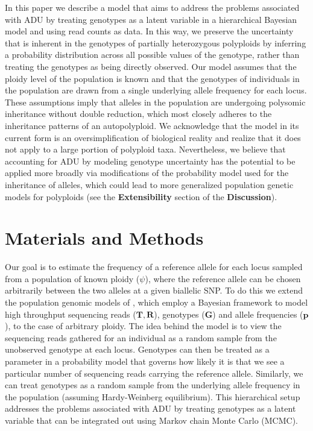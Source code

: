 \documentclass[11pt,english,letterpaper,oneside]{article}
\begin{document}
In this paper we describe a model that aims to address the problems associated with ADU by treating genotypes as a latent variable in a hierarchical Bayesian model and using read counts as data. In this way, we preserve the uncertainty that is inherent in the genotypes of partially heterozygous polyploids by inferring a probability distribution across all possible values of the genotype, rather than treating the genotypes as being directly observed. Our model assumes that the ploidy level of the population is known and that the genotypes of individuals in the population are drawn from a single underlying allele frequency for each locus. These assumptions imply that alleles in the population are undergoing polysomic inheritance without double reduction, which most closely adheres to the inheritance patterns of an autopolyploid. We acknowledge that the model in its current form is an oversimplification of biological reality and realize that it does not apply to a large portion of polyploid taxa. Nevertheless, we believe that accounting for ADU by modeling genotype uncertainty has the potential to be applied more broadly via modifications of the probability model used for the inheritance of alleles, which could lead to more generalized population genetic models for polyploids (see the \textbf{Extensibility} section of the \textbf{Discussion}). 
\medskip

\section*{Materials and Methods}        %

\noindent Our goal is to estimate the frequency of a reference allele for each locus sampled from a population of known ploidy ($\psi$), where the reference allele can be chosen arbitrarily between the two alleles at a given biallelic SNP. To do this we extend the population genomic models of \cite{buerkle2013popModels}, which employ a Bayesian framework to model high throughput sequencing reads ($\bm{T},\bm{R}$), genotypes ($\bm{G}$) and allele frequencies ($\bm{p}$), to the case of arbitrary ploidy. The idea behind the model is to view the sequencing reads gathered for an individual as a random sample from the unobserved genotype at each locus. Genotypes can then be treated as a parameter in a probability model that governs how likely it is that we see a particular number of sequencing reads carrying the reference allele. Similarly, we can treat genotypes as a random sample from the underlying allele frequency in the population (assuming Hardy-Weinberg equilibrium). This hierarchical setup addresses the problems associated with ADU by treating genotypes as a latent variable that can be integrated out using Markov chain Monte Carlo (MCMC).
\end{document}
